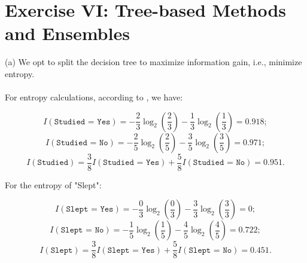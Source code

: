 \section{Exercise VI: Tree-based Methods and Ensembles}

(a) We opt to split the decision tree to maximize information gain, i.e., minimize entropy. \\ \\
For entropy calculations, according to \cite{1}, we have:

\begin{center}
\end{center}

\[
    I(\texttt{Studied = Yes}) = -\frac{2}{3}\log_2(\frac{2}{3}) -\frac{1}{3}\log_2(\frac{1}{3}) = 0.918 ;
\]
\[
   I(\texttt{Studied = No}) = -\frac{2}{5}\log_2(\frac{2}{5}) -\frac{3}{5}\log_2(\frac{3}{5}) = 0.971 ;
\]
\[
\boxed{
   I(\texttt{Studied}) = \frac{3}{8}I(\texttt{Studied = Yes}) + \frac{5}{8}I(\texttt{Studied = No}) = 0.951.}
\]

For the entropy of "Slept":

\begin{center}
\end{center}

\[
   I(\texttt{Slept = Yes}) = -\frac{0}{3}\log_2(\frac{0}{3}) -\frac{3}{3}\log_2(\frac{3}{3}) = 0 ;
\]
\[
   I(\texttt{Slept = No}) = -\frac{1}{5}\log_2(\frac{1}{5}) -\frac{4}{5}\log_2(\frac{4}{5}) = 0.722 ;
\]
\[
\boxed{
   I(\texttt{Slept}) = \frac{3}{8}I(\texttt{Slept = Yes}) + \frac{5}{8}I(\texttt{Slept = No}) = 0.451.}
\]

